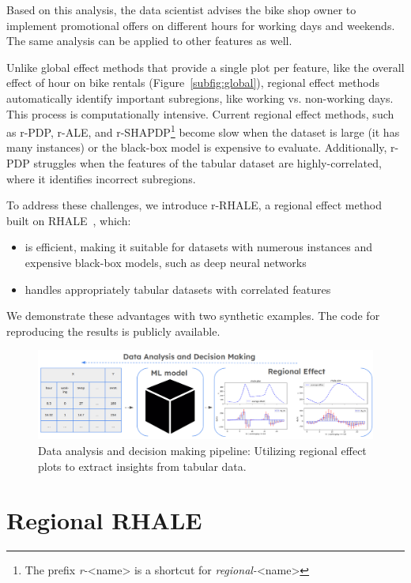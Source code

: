 \documentclass[
twocolumn,
]{ceurart}
\begin{document}
Based on this analysis, the data scientist advises the bike shop owner to implement promotional offers on different hours for working days and weekends. The same analysis can be applied to other features as well.

Unlike global effect methods that provide a single plot per feature, like the overall effect of hour on bike rentals (Figure~\ref{subfig:global}), regional effect methods automatically identify important subregions, like working vs. non-working days. This process is computationally intensive. Current regional effect methods, such as r-PDP, r-ALE, and r-SHAPDP\footnote{The prefix \textit{r-}<name> is a shortcut for \textit{regional-}<name>} become slow when the dataset is large (it has many instances) or the black-box model is expensive to evaluate. Additionally, r-PDP struggles when the features of the tabular dataset are highly-correlated, where it identifies incorrect subregions.

To address these challenges, we introduce r-RHALE, a regional effect method built on RHALE~\cite{gkolemis2023rhale, gkolemis22a}, which:

\begin{itemize}
\item is efficient, making it suitable for datasets with numerous instances and expensive black-box models, such as deep neural networks
\item handles appropriately tabular datasets with correlated features
\end{itemize}

We demonstrate these advantages with two synthetic examples. The code for reproducing the results is publicly available.

\begin{figure}[t]
    \centering
    \includegraphics[width=\textwidth]{figures/concept_image.png}
    \caption{Data analysis and decision making pipeline: Utilizing regional effect plots to extract insights from tabular data.}
    \label{fig:concept_figure}
\end{figure}

\section{Regional RHALE}
\end{document}
